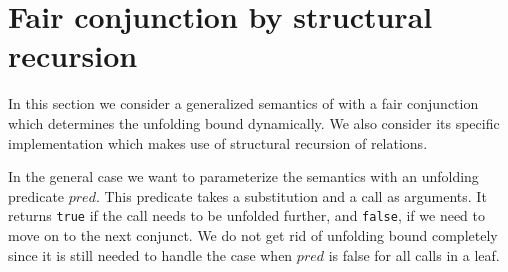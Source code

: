 \section{Fair conjunction by structural recursion}
\label{sec:structural}

In this section we consider a generalized semantics of \mk with a fair conjunction which determines the unfolding bound dynamically. We also consider its specific implementation
which makes use of structural recursion of relations.

In the general case we want to parameterize the semantics with an unfolding predicate $pred$. This predicate takes a substitution and a call as arguments. It returns \lstinline{true}
if the call needs to be unfolded further, and \lstinline{false}, if we need to move on to the next conjunct. We do not get rid of unfolding bound completely since it is still needed to handle
the case when $pred$ is false for all calls in a leaf.

